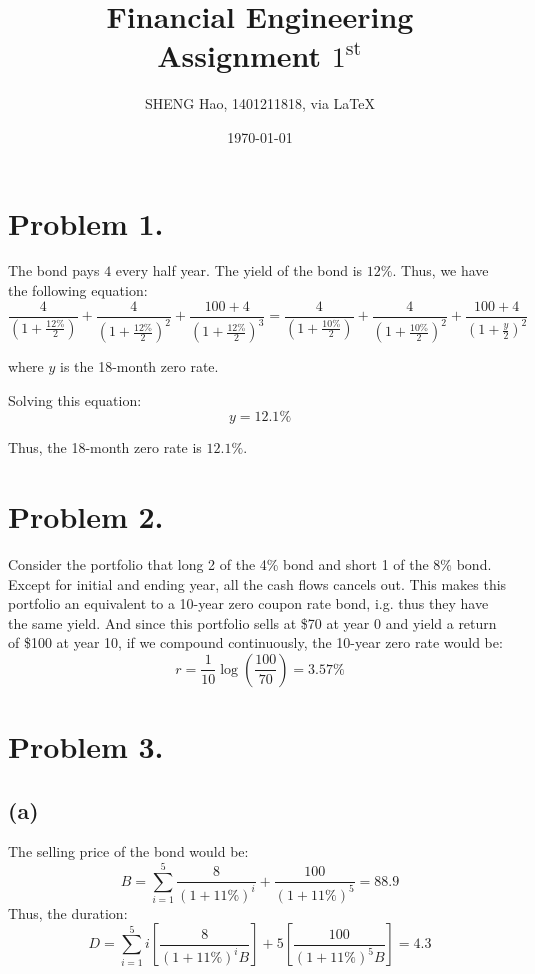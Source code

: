 \documentclass{article}
\begin{document}
\title{Financial Engineering\\Assignment $1^{\text{st}}$}
\author{{\normalsize SHENG Hao, 1401211818, via \LaTeX}}
\date{\today}

\maketitle

\def \Pr{{\rm Pr}}
\baselineskip 0.6cm


\section{Problem 1.}
The bond pays $4$ every half year. The yield of the bond is $12 \%$. Thus, we have the following equation:
\begin{equation}
  \frac{4}{(1 + \frac{12 \%}{2})} + \frac{4}{(1 + \frac{12 \%}{2})^2} + \frac{100+ 4}{(1 + \frac{12 \%}{2})^3} = \frac{4}{(1 + \frac{10 \%}{2})} + \frac{4}{(1 + \frac{10 \%}{2})^2} + 
\frac{100 + 4}{(1 + \frac{y}{2})^2}
\end{equation}

where $y$ is the 18-month zero rate. 

Solving this equation:
$$ y = 12.1 \% $$

Thus, the 18-month zero rate is $12.1 \%$.

\section{Problem 2.}
Consider the portfolio that long 2 of the 4\% bond and short 1 of the 8\% bond. Except for initial and ending year, all the cash flows cancels out. This makes this portfolio an equivalent to a 10-year zero coupon rate bond, i.g. thus they have the same yield. And since this portfolio sells at \$70 at year 0 and yield a return of \$100 at year 10, if we compound continuously, the 10-year zero rate would be:
\begin{equation}
   r=\frac{1}{10} \log \left(\frac{100}{70}\right) = 3.57 \% 
\end{equation}

\section{Problem 3.}
\subsection{(a)}
The selling price of the bond would be:
\begin{equation}
  B = \sum_{i = 1}^{5} \frac{8}{(1+ 11\%)^i} + \frac{100}{(1+11 \%)^5} = 88.9
\end{equation}
Thus, the duration:
\begin{equation}
  D = \sum_{i=1}^{5} i \left[ \frac{8}{(1 + 11 \%)^i B} \right] + 5 \left[ \frac{100}{(1+ 11 \%)^5 B} \right ] = 4.3 
\end{equation}
\end{document}
